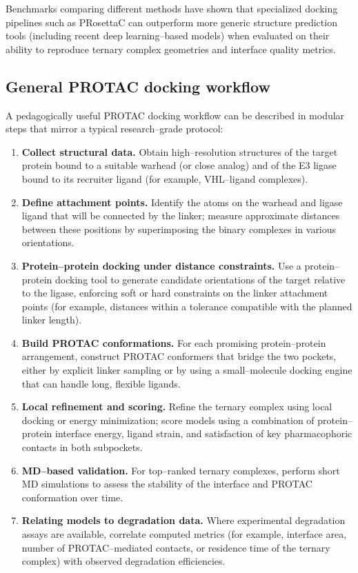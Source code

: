 \documentclass[12pt]{article}
\begin{document}
Benchmarks comparing different methods have shown that specialized docking pipelines such as PRosettaC can outperform more generic structure prediction tools (including recent deep learning–based models) when evaluated on their ability to reproduce ternary complex geometries and interface quality metrics.\cite{CH14_PRosettaCAf3_2025}

\subsection{General PROTAC docking workflow}

A pedagogically useful PROTAC docking workflow can be described in modular steps that mirror a typical research–grade protocol:

\begin{enumerate}
  \item \textbf{Collect structural data.} Obtain high–resolution structures of the target protein bound to a suitable warhead (or close analog) and of the E3 ligase bound to its recruiter ligand (for example, VHL–ligand complexes).  
  \item \textbf{Define attachment points.} Identify the atoms on the warhead and ligase ligand that will be connected by the linker; measure approximate distances between these positions by superimposing the binary complexes in various orientations.  
  \item \textbf{Protein–protein docking under distance constraints.} Use a protein–protein docking tool to generate candidate orientations of the target relative to the ligase, enforcing soft or hard constraints on the linker attachment points (for example, distances within a tolerance compatible with the planned linker length).  
  \item \textbf{Build PROTAC conformations.} For each promising protein–protein arrangement, construct PROTAC conformers that bridge the two pockets, either by explicit linker sampling or by using a small–molecule docking engine that can handle long, flexible ligands.  
  \item \textbf{Local refinement and scoring.} Refine the ternary complex using local docking or energy minimization; score models using a combination of protein–protein interface energy, ligand strain, and satisfaction of key pharmacophoric contacts in both subpockets.  
  \item \textbf{MD–based validation.} For top–ranked ternary complexes, perform short MD simulations to assess the stability of the interface and PROTAC conformation over time.  
  \item \textbf{Relating models to degradation data.} Where experimental degradation assays are available, correlate computed metrics (for example, interface area, number of PROTAC–mediated contacts, or residence time of the ternary complex) with observed degradation efficiencies.
\end{enumerate}
\end{document}
